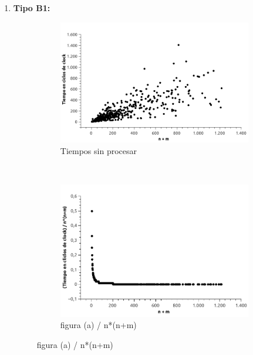 \begin{enumerate}
\item \textbf{Tipo B1:}

\begin{figure}[H]
        \centering
        \begin{subfigure}[b]{0.5\textwidth}
                \includegraphics[width=\textwidth]{imagenes/ejer4-grafB1-1.jpg}
                \caption{Tiempos sin procesar}
        \end{subfigure}%
        ~ %
        \begin{subfigure}[b]{0.5\textwidth}
                \includegraphics[width=\textwidth]{imagenes/ejer4-grafB1-2.jpg}
                \caption{figura (a) / n*(n+m)}
        \end{subfigure}
        

\end{figure}
\end{enumerate}
